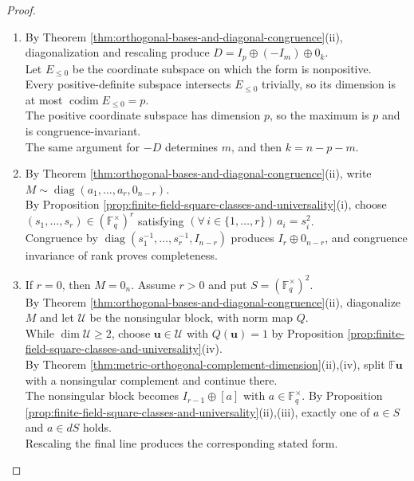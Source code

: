 \begin{theorem}
\begin{proof}
\begin{enumerate}[label=(\roman*)]
Congruence by $\operatorname{diag}(s_1^{-1},\ldots,s_r^{-1},I_{n-r})$ produces $I_r\oplus0_{n-r}$.\\
Rank is congruence-invariant by Proposition \ref{prop:metric-form-matrix-recovery-and-congruence}(iv), so it is complete.
\item By Theorem \ref{thm:orthogonal-bases-and-diagonal-congruence}(ii), diagonalization and rescaling produce $D=I_p\oplus(-I_m)\oplus0_k$.\\
Let $E_{\leq0}$ be the coordinate subspace on which the form is nonpositive.\\
Every positive-definite subspace intersects $E_{\leq0}$ trivially, so its dimension is at most $\operatorname{codim}E_{\leq0}=p$.\\
The positive coordinate subspace has dimension $p$, so the maximum is $p$ and is congruence-invariant.\\
The same argument for $-D$ determines $m$, and then $k=n-p-m$.
\item By Theorem \ref{thm:orthogonal-bases-and-diagonal-congruence}(ii), write $M\sim\operatorname{diag}(a_1,\ldots,a_r,0_{n-r})$.\\
By Proposition \ref{prop:finite-field-square-classes-and-universality}(i), choose $(s_1,\ldots,s_r)\in(\mathbb{F}_q^{\times})^r$ satisfying $(\forall\,i\in\{1,\ldots,r\})\,a_i=s_i^2$.\\
Congruence by $\operatorname{diag}(s_1^{-1},\ldots,s_r^{-1},I_{n-r})$ produces $I_r\oplus0_{n-r}$, and congruence invariance of rank proves completeness.
\item If $r=0$, then $M=0_n$. Assume $r>0$ and put $S=(\mathbb{F}_q^{\times})^2$.\\
By Theorem \ref{thm:orthogonal-bases-and-diagonal-congruence}(ii), diagonalize $M$ and let $\mathcal{U}$ be the nonsingular block, with norm map $Q$.\\
While $\dim\mathcal{U}\geq2$, choose $\mathbf{u}\in\mathcal{U}$ with $Q(\mathbf{u})=1$ by Proposition \ref{prop:finite-field-square-classes-and-universality}(iv).\\
By Theorem \ref{thm:metric-orthogonal-complement-dimension}(ii),(iv), split $\mathbb{F}\mathbf{u}$ with a nonsingular complement and continue there.\\
The nonsingular block becomes $I_{r-1}\oplus[a]$ with $a\in\mathbb{F}_q^{\times}$. By Proposition \ref{prop:finite-field-square-classes-and-universality}(ii),(iii), exactly one of $a\in S$ and $a\in dS$ holds.\\
Rescaling the final line produces the corresponding stated form.\\

\end{enumerate}
\end{proof}
\end{theorem}
